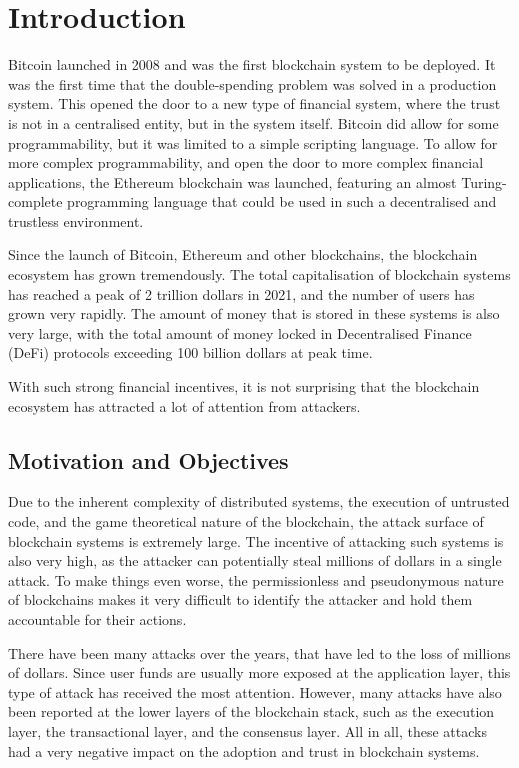 \chapter{Introduction}\label{chap:introduction}
Bitcoin launched in 2008 and was the first blockchain system to be deployed.
It was the first time that the double-spending problem was solved in a production system.
This opened the door to a new type of financial system, where the trust is not in a centralised entity, but in the system itself.
Bitcoin did allow for some programmability, but it was limited to a simple scripting language.
To allow for more complex programmability, and open the door to more complex financial applications, the Ethereum blockchain was launched, featuring an almost Turing-complete programming language that could be used in such a decentralised and trustless environment.

Since the launch of Bitcoin, Ethereum and other blockchains, the blockchain ecosystem has grown tremendously.
The total capitalisation of blockchain systems has reached a peak of 2 trillion dollars in 2021, and the number of users has grown very rapidly.
The amount of money that is stored in these systems is also very large, with the total amount of money locked in Decentralised Finance (DeFi) protocols exceeding 100 billion dollars at peak time.

With such strong financial incentives, it is not surprising that the blockchain ecosystem has attracted a lot of attention from attackers.

\section{Motivation and Objectives}

Due to the inherent complexity of distributed systems, the execution of untrusted code, and the game theoretical nature of the blockchain, the attack surface of blockchain systems is extremely large.
The incentive of attacking such systems is also very high, as the attacker can potentially steal millions of dollars in a single attack.
To make things even worse, the permissionless and pseudonymous nature of blockchains makes it very difficult to identify the attacker and hold them accountable for their actions.

There have been many attacks over the years, that have led to the loss of millions of dollars.
Since user funds are usually more exposed at the application layer, this type of attack has received the most attention.
However, many attacks have also been reported at the lower layers of the blockchain stack, such as the execution layer, the transactional layer, and the consensus layer.
All in all, these attacks had a very negative impact on the adoption and trust in blockchain systems.

